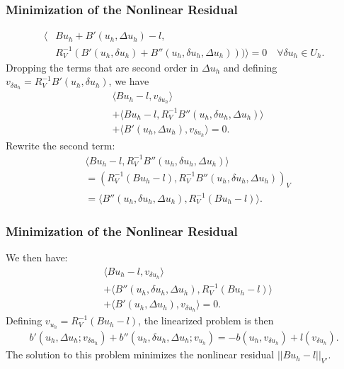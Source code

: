 \documentclass[mathserif]{beamer}
\newcommand{\NVRnorm}[1]{\left|\left|#1\right|\right|}
\begin{document}
\addtocounter{framenumber}{-1} %
\begin{frame}
\frametitle{Minimization of the Nonlinear Residual}
\begin{align*}
\langle &Bu_{h} + B'(u_{h},\Delta u_{h}) - l,\\
             &R_{V}^{-1}\left( B'(u_{h},\delta u_{h}) + B''(u_{h},\delta u_{h},\Delta u_{h}) \right)) \rangle = 0 \quad \forall \delta u_{h} \in U_{h}.
\end{align*}
Dropping the terms that are second order in $\Delta u_{h}$ and defining $v_{\delta u_{h}} = R_{V}^{-1}B'(u_{h},\delta u_{h})$, we have
\begin{align*}
&\langle Bu_{h} - l, v_{\delta u_{h}} \rangle\\
 &+ \langle Bu_{h} - l, R_{V}^{-1}B''(u_{h},\delta u_{h},\Delta u_{h}) \rangle \\
 &+ \langle B'(u_{h},\Delta u_{h}),  v_{\delta u_{h}} \rangle = 0.
\end{align*}
Rewrite the second term:
\begin{align*}
&\langle Bu_{h} - l, R_{V}^{-1}B''(u_{h},\delta u_{h},\Delta u_{h}) \rangle\\
 &= \left( R_{V}^{-1} (Bu_{h} - l), R_{V}^{-1}B''(u_{h},\delta u_{h},\Delta u_{h}) \right)_{V} \\
&= \langle B''(u_{h},\delta u_{h},\Delta u_{h}), R_{V}^{-1} (Bu_{h} - l) \rangle.
\end{align*}
\end{frame}
\addtocounter{framenumber}{-1} %
\begin{frame}
\frametitle{Minimization of the Nonlinear Residual}
We then have:
\begin{align*}
&\langle Bu_{h} - l, v_{\delta u_{h}} \rangle\\
 &+ \langle B''(u_{h},\delta u_{h},\Delta u_{h}), R_{V}^{-1} (Bu_{h} - l) \rangle \\
 &+ \langle B'(u_{h},\Delta u_{h}),  v_{\delta u_{h}} \rangle = 0.
\end{align*}
Defining $v_{u_{h}} = R_{V}^{-1} (Bu_{h} - l)$, the linearized problem is then
\begin{align*}
b'(u_{h},\Delta u_{h}; v_{\delta u_{h}}) + b''(u_{h},\delta u_{h}, \Delta u_{h}; v_{u_{h}}) = - b(u_{h}, v_{\delta u_{h}}) + l(v_{\delta u_{h}}).
\end{align*}
The solution to this problem minimizes the nonlinear residual $\NVRnorm{Bu_{h}-l}_{V'}$.
\end{frame}
\end{document}
